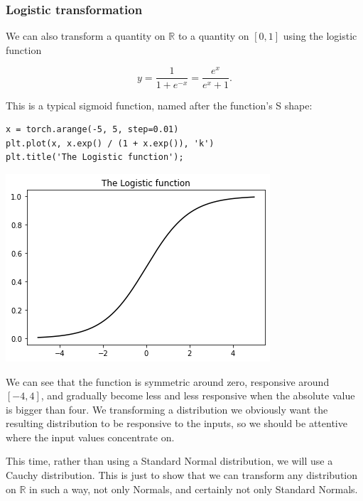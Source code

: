 \documentclass[11pt]{article}
\begin{document}
\subsubsection{Logistic transformation}
\label{sec:org585a926}

We can also transform a quantity on \(\mathbb{R}\) to a quantity on \([0, 1]\) using the logistic function

$$y = \frac{1}{1 + e^{-x}} = \frac{e^x}{e^x + 1}.$$

This is a typical sigmoid function, named after the function's S shape:

\begin{verbatim}
x = torch.arange(-5, 5, step=0.01)
plt.plot(x, x.exp() / (1 + x.exp()), 'k')
plt.title('The Logistic function');
\end{verbatim}

\begin{center}
\includegraphics[width=.9\linewidth]{./.ob-jupyter/5551a2c94dbbc7acbbf157b17ae7f259cc299c6c.png}
\end{center}

We can see that the function is symmetric around zero, responsive around \([-4, 4]\), and gradually become less and less responsive when the absolute value is bigger than four. We transforming a distribution we obviously want the resulting distribution to be responsive to the inputs, so we should be attentive where the input values concentrate on.

This time, rather than using a Standard Normal distribution, we will use a Cauchy distribution. This is just to show that we can transform any distribution on \(\mathbb{R}\) in such a way, not only Normals, and certainly not only Standard Normals.
\end{document}
